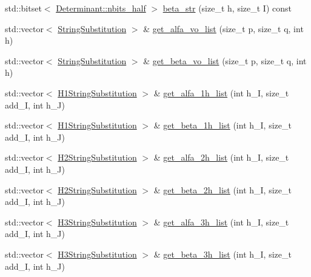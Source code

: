 \begin{DoxyCompactItemize}
\item 
std\+::bitset$<$ \mbox{\hyperlink{classforte_1_1_determinant_impl_ac8d2a64c2fb785ccb79b1cecc553d63d}{Determinant\+::nbits\+\_\+half}} $>$ \mbox{\hyperlink{classforte_1_1_string_lists_aa6a85b05b81132b50ae7131c854851b1}{beta\+\_\+str}} (size\+\_\+t h, size\+\_\+t I) const
\item 
std\+::vector$<$ \mbox{\hyperlink{structforte_1_1_string_substitution}{String\+Substitution}} $>$ \& \mbox{\hyperlink{classforte_1_1_string_lists_a6a1d849d51b237d737d5062209f7f2f5}{get\+\_\+alfa\+\_\+vo\+\_\+list}} (size\+\_\+t p, size\+\_\+t q, int h)
\item 
std\+::vector$<$ \mbox{\hyperlink{structforte_1_1_string_substitution}{String\+Substitution}} $>$ \& \mbox{\hyperlink{classforte_1_1_string_lists_af2c198e6452da8aa2f71a4201516f3ba}{get\+\_\+beta\+\_\+vo\+\_\+list}} (size\+\_\+t p, size\+\_\+t q, int h)
\item 
std\+::vector$<$ \mbox{\hyperlink{structforte_1_1_h1_string_substitution}{H1\+String\+Substitution}} $>$ \& \mbox{\hyperlink{classforte_1_1_string_lists_a20cc6113b549a64ab0cab1f57e45747d}{get\+\_\+alfa\+\_\+1h\+\_\+list}} (int h\+\_\+I, size\+\_\+t add\+\_\+I, int h\+\_\+J)
\item 
std\+::vector$<$ \mbox{\hyperlink{structforte_1_1_h1_string_substitution}{H1\+String\+Substitution}} $>$ \& \mbox{\hyperlink{classforte_1_1_string_lists_a50ac4f357033b7f498dca10e6b21855e}{get\+\_\+beta\+\_\+1h\+\_\+list}} (int h\+\_\+I, size\+\_\+t add\+\_\+I, int h\+\_\+J)
\item 
std\+::vector$<$ \mbox{\hyperlink{structforte_1_1_h2_string_substitution}{H2\+String\+Substitution}} $>$ \& \mbox{\hyperlink{classforte_1_1_string_lists_a7657b34571a6a8248a52cfeda6cc84a6}{get\+\_\+alfa\+\_\+2h\+\_\+list}} (int h\+\_\+I, size\+\_\+t add\+\_\+I, int h\+\_\+J)
\item 
std\+::vector$<$ \mbox{\hyperlink{structforte_1_1_h2_string_substitution}{H2\+String\+Substitution}} $>$ \& \mbox{\hyperlink{classforte_1_1_string_lists_a29a14dabfcd6a58d55b057d1e97d909a}{get\+\_\+beta\+\_\+2h\+\_\+list}} (int h\+\_\+I, size\+\_\+t add\+\_\+I, int h\+\_\+J)
\item 
std\+::vector$<$ \mbox{\hyperlink{structforte_1_1_h3_string_substitution}{H3\+String\+Substitution}} $>$ \& \mbox{\hyperlink{classforte_1_1_string_lists_acc61ca0e1d5641cfe7ed672e524f85e0}{get\+\_\+alfa\+\_\+3h\+\_\+list}} (int h\+\_\+I, size\+\_\+t add\+\_\+I, int h\+\_\+J)
\item 
std\+::vector$<$ \mbox{\hyperlink{structforte_1_1_h3_string_substitution}{H3\+String\+Substitution}} $>$ \& \mbox{\hyperlink{classforte_1_1_string_lists_a52f6db215396308f827903d65eb49613}{get\+\_\+beta\+\_\+3h\+\_\+list}} (int h\+\_\+I, size\+\_\+t add\+\_\+I, int h\+\_\+J)

\end{DoxyCompactItemize}
